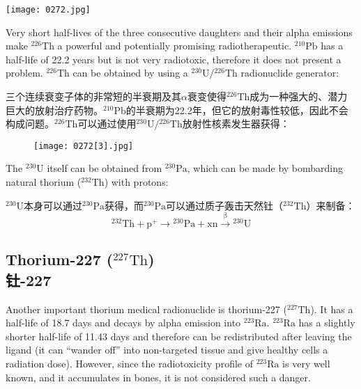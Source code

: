 \documentclass[dvipsnames, svgnames,a4paper,11pt]{article}
\begin{document}
\begin{figure*}[h]
	\centering
    \texttt{[image: 0272.jpg]}  
\end{figure*}

Very short half-lives of the three consecutive daughters and their alpha emissions make \(\mathrm{^{226}Th}\) a powerful and potentially promising radiotherapeutic. \(\mathrm{^{210}Pb}\) has a half-life of 22.2 years but is not very radiotoxic, therefore it does not present a problem. \(\mathrm{^{226}Th}\) can be obtained by using a \(\mathrm{^{230}U}/\mathrm{^{226}Th}\) radionuclide generator:  

三个连续衰变子体的非常短的半衰期及其$\alpha$衰变使得\(\mathrm{^{226}Th}\)成为一种强大的、潜力巨大的放射治疗药物。\(\mathrm{^{210}Pb}\)的半衰期为22.2年，但它的放射毒性较低，因此不会构成问题。\(\mathrm{^{226}Th}\)可以通过使用\(\mathrm{^{230}U}/\mathrm{^{226}Th}\)放射性核素发生器获得：  

\begin{figure}[h]
	\centering
    \texttt{[image: 0272[3].jpg]}  
     \label{fig368}
\end{figure}

The \(\mathrm{^{230}U}\) itself can be obtained from \(\mathrm{^{230}Pa}\), which can be made by bombarding natural thorium (\(\mathrm{^{232}Th}\)) with protons:  

\(\mathrm{^{230}U}\)本身可以通过\(\mathrm{^{230}Pa}\)获得，而\(\mathrm{^{230}Pa}\)可以通过质子轰击天然钍（\(\mathrm{^{232}Th}\)）来制备：  
\[\mathrm{^{232}Th} + \mathrm{p^+} \to \mathrm{^{230}Pa} + \mathrm{xn}\xrightarrow{\mathrm{\beta}} \mathrm{^{230}U}\]

\subsection{Thorium-227 (\(\mathrm{^{227}Th}\)) \\钍-227}  
Another important thorium medical radionuclide is thorium-227 (\(\mathrm{^{227}Th}\)). It has a half-life of 18.7 days and decays by alpha emission into \(\mathrm{^{223}Ra}\). \(\mathrm{^{223}Ra}\) has a slightly shorter half-life of 11.43 days and therefore can be redistributed after leaving the ligand (it can “wander off” into non-targeted tissue and give healthy cells a radiation dose). However, since the radiotoxicity profile of \(\mathrm{^{223}Ra}\) is very well known, and it accumulates in bones, it is not considered such a danger.
\end{document}

